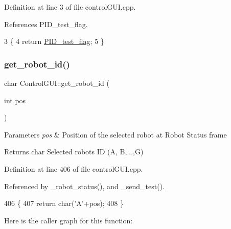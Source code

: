 Definition at line 3 of file control\+G\+U\+I.\+cpp.



References P\+I\+D\+\_\+test\+\_\+flag.


\begin{DoxyCode}
3                                    \{
4     \textcolor{keywordflow}{return} \hyperlink{class_control_g_u_i_a7839defbdc6354cabaa58ceadfe926c3}{PID\_test\_flag};
5 \}
\end{DoxyCode}
\mbox{\label{class_control_g_u_i_ae165819cbfce64d6604aac836faf9f1a}} 
\subsubsection{\texorpdfstring{get\+\_\+robot\+\_\+id()}{get\_robot\_id()}}
{\footnotesize\ttfamily char Control\+G\+U\+I\+::get\+\_\+robot\+\_\+id (\begin{DoxyParamCaption}\item[{int}]{pos }\end{DoxyParamCaption})}


\begin{DoxyParams}{Parameters}
{\em pos} & Position of the selected robot at Robot Status frame \\
\hline
\end{DoxyParams}
\begin{DoxyReturn}{Returns}
char Selected robot\textquotesingle{}s ID (A, B,...,G) 
\end{DoxyReturn}


Definition at line 406 of file control\+G\+U\+I.\+cpp.



Referenced by \+\_\+robot\+\_\+status(), and \+\_\+send\+\_\+test().


\begin{DoxyCode}
406                                      \{
407     \textcolor{keywordflow}{return} char(\textcolor{charliteral}{'A'}+pos);
408 \}
\end{DoxyCode}
Here is the caller graph for this function\+:
\mbox{\label{class_control_g_u_i_a73461b797a120e541d151ab0d50f0537}} 

